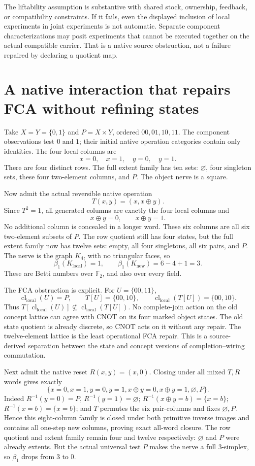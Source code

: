 \documentclass[11pt]{article}
\theoremstyle{remark}\newtheorem{remark}[theorem]{Remark}
\newcommand{\cl}{\operatorname{cl}}
\begin{document}
The liftability assumption is substantive with shared stock, ownership,
feedback, or compatibility constraints. If it fails, even the displayed
inclusion of local experiments in joint experiments is not automatic.
Separate component characterizations may posit experiments that cannot
be executed together on the actual compatible carrier. That is a native
source obstruction, not a failure repaired by declaring a quotient map.

\section{A native interaction that repairs FCA without refining states}
Take $X=Y=\{0,1\}$ and $P=X\times Y$, ordered $00,01,10,11$.
The component observations test $0$ and $1$; their initial native
operation categories contain only identities. The four local columns
are
\[
 x=0,\quad x=1,\quad y=0,\quad y=1.
\]
There are four distinct rows. The full extent family has ten sets:
$\varnothing$, four singleton sets, these four two-element columns,
and $P$. The object nerve is a square.

Now admit the actual reversible native operation
\[
 T(x,y)=(x,x\oplus y).
\]
Since $T^2=1$, all generated columns are exactly the four local columns
and
\[
 x\oplus y=0,\qquad x\oplus y=1.
\]
No additional column is concealed in a longer word. These six columns
are all six two-element subsets of $P$. The row quotient still has
four states, but the full extent family now has twelve sets: empty,
all four singletons, all six pairs, and $P$. The nerve is the graph
$K_4$, with no triangular faces, so
\[
 \beta_1(K_{\mathrm{local}})=1,
 \qquad \beta_1(K_{\mathrm{new}})=6-4+1=3.
\]
These are Betti numbers over $\mathbb F_2$, and also over every field.

The FCA obstruction is explicit. For $U=\{00,11\}$,
\[
 \cl_{\mathrm{local}}(U)=P,
 \qquad
 T[U]=\{00,10\},
 \qquad
 \cl_{\mathrm{local}}(T[U])=\{00,10\}.
\]
Thus $T[\cl_{\mathrm{local}}(U)]\not\subseteq
\cl_{\mathrm{local}}(T[U])$. No complete-join action on the old
concept lattice can agree with CNOT on its four marked object states.
The old state quotient is already discrete, so CNOT acts on it without
any repair. The twelve-element lattice is the least operational FCA
repair. This is a source-derived separation between the state and
concept versions of completion--wiring commutation.

Next admit the native reset $R(x,y)=(x,0)$. Closing under all mixed
$T,R$ words gives exactly
\[
 \{x=0,x=1,y=0,y=1,x\oplus y=0,x\oplus y=1,\varnothing,P\}.
\]
Indeed $R^{-1}(y=0)=P$, $R^{-1}(y=1)=\varnothing$;
$R^{-1}(x\oplus y=b)=\{x=b\}$;
$R^{-1}(x=b)=\{x=b\}$; and $T$ permutes the six pair-columns
and fixes $\varnothing,P$. Hence this eight-column family is closed
under both primitive inverse images and contains all one-step new
columns, proving exact all-word closure. The row quotient and extent
family remain four and twelve respectively: $\varnothing$ and $P$
were already extents. But the actual universal test $P$ makes the
nerve a full $3$-simplex, so $\beta_1$ drops from $3$ to $0$.
\end{document}
